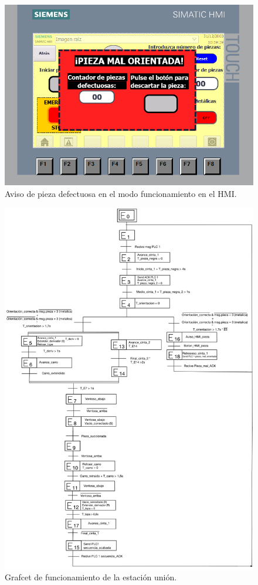 \begin{figure}[h!]
  \includegraphics[width=16cm]{figs/HMI_descarte}
  \caption{\centering Aviso de pieza defectuosa en el modo funcionamiento en el HMI.}
  \label{fig:HMI_descarte}
\end{figure}

\begin{figure}[h!]
  \includegraphics[width=15cm]{figs/grafcet_union}
  \caption{\centering Grafcet de funcionamiento de la estación unión.}
  \label{fig:grafcet_union}
\end{figure}


